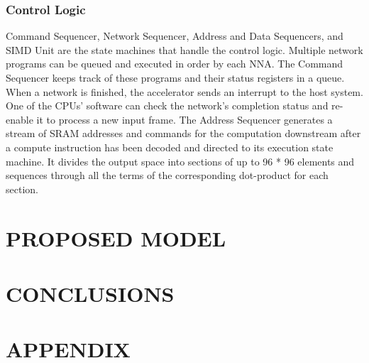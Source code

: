 \documentclass[letterpaper, 10 pt, conference]{ieeeconf}  %
\begin{document}
\subsubsection{Control Logic}
Command Sequencer, Network Sequencer, Address and Data Sequencers, and SIMD Unit are the state machines that handle the control logic. Multiple network programs can be queued and executed in order by each NNA. The Command Sequencer keeps track of these programs and their status registers in a queue. When a network is finished, the accelerator sends an interrupt to the host system. One of the CPUs' software can check the network's completion status and re-enable it to process a new input frame. The Address Sequencer generates a stream of SRAM addresses and commands for the computation downstream after a compute instruction has been decoded and directed to its execution state machine. It divides the output space into sections of up to 96 * 96 elements and sequences through all the terms of the corresponding dot-product for each section.


\section{PROPOSED MODEL}

\section{CONCLUSIONS}



\addtolength{\textheight}{-12cm}   %







\section*{APPENDIX}
\end{document}
